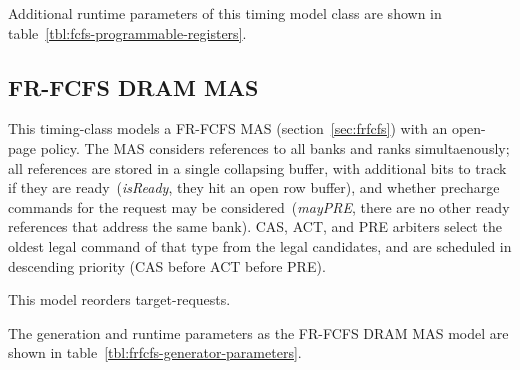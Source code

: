 \noindent Additional runtime parameters of this timing model class are shown in
table~\ref{tbl:fcfs-programmable-registers}.

\begin{table}[htb]
\begin{center}
\end{center}
\caption{Programmable registers of the FCFS DRAM MAS model.}
\label{tbl:fcfs-programmable-registers}
\end{table}%

\subsection{FR-FCFS DRAM MAS} This timing-class models a FR-FCFS MAS
(section~\ref{sec:frfcfs}) with an open-page policy. The MAS considers
references to all banks and ranks simultaenously; all references are stored in
a single collapsing buffer, with additional bits to track if they are
ready~(\emph{isReady}, they hit an open row buffer), and whether precharge
commands for the request may be considered~(\emph{mayPRE}, there are no other
ready references that address the same bank). CAS, ACT, and PRE arbiters select
the oldest legal command of that type from the legal candidates, and are
scheduled in descending priority (CAS before ACT before PRE).

This model reorders target-requests.

The generation and runtime parameters as the FR-FCFS DRAM MAS model are shown
in table~\ref{tbl:frfcfs-generator-parameters}.

\begin{table}[htb]
\begin{center}
\end{center}
\caption{Generation parameters of the DDR3 FR-FCFS MAS model.}
\label{tbl:frfcfs-generator-parameters}
\end{table}%

